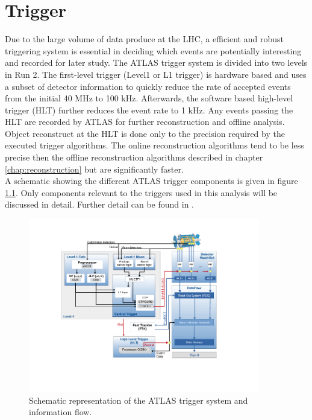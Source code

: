 \chapter{Trigger}
\label{chap:trigger}

\indent Due to the large volume of data produce at the LHC, a efficient and robust triggering system is essential in deciding which events are potentially interesting and recorded for later study.  The ATLAS trigger system is divided into two levels in Run 2.  The first-level trigger (Level1 or L1 trigger) is hardware based and uses a subset of detector information to quickly reduce the rate of accepted events from the initial 40 MHz to 100 kHz.  Afterwards, the software based high-level trigger (HLT) further reduces the event rate to 1 kHz.  Any events passing the HLT are recorded by ATLAS for further reconstruction and offline analysis. \\

\indent Object reconstruct at the HLT is done only to the precision required by the executed trigger algorithms.  The online reconstruction algorithms tend to be less precise then the offline reconstruction algorithms described in chapter \ref{chap:reconstruction} but are significantly faster. \\

\indent A schematic showing the different ATLAS trigger components is given in figure \ref{fig:trigScheme}.  Only components relevant to the triggers used in this analysis will be discussed in detail.  Further detail can be found in \cite{Trigger2015}.

\begin{figure}[htb]
  \begin{center}
    \includegraphics[width=0.90\textwidth]{figures/trigger/tdaq-schematic.png}\hspace{0.05\textwidth}
\end{center}
\caption{Schematic representation of the ATLAS trigger system and information flow.\cite{Trigger2015}}
\label{fig:trigScheme} 
\end{figure}

